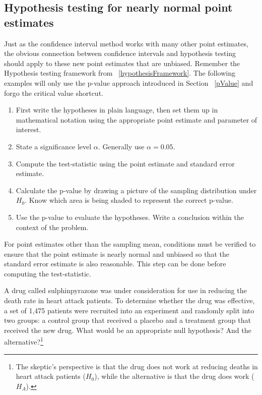\subsection{Hypothesis testing for nearly normal point estimates}

Just as the confidence interval method works with many other point estimates, the obvious connection between confidence intervals and hypothesis testing should apply to these new point estimates that are unbiased. Remember the Hypothesis testing framework from ~\ref{hypothesisFramework}. The following examples will only use the p-value approach introduced in Section ~\ref{pValue} and forgo the critical value shortcut.  

\begin{termBox}{
\begin{enumerate}
\setlength{\itemsep}{0mm}
\item First write the hypotheses in plain language, then set them up in mathematical notation using the appropriate point estimate and parameter of interest. 
\item State a significance level $\alpha$. Generally use $\alpha=0.05$. 
\item Compute the test-statistic using the point estimate and standard error estimate. 
\item Calculate the p-value by drawing a picture of the sampling distribution under $H_0$. Know which area is being shaded to represent the correct p-value. 
\item Use the p-value to evaluate the hypotheses. Write a conclusion within the context of the problem. 
\end{enumerate}
} For point estimates other than the sampling mean, conditions must be verified to ensure that the point estimate is nearly normal and unbiased so that the standard error estimate is also reasonable. This step can be done before computing the test-statistic.  
\end{termBox}

\begin{exercise} \label{fdaHypSetupForSulph}
A drug called sulphinpyrazone was under consideration for use in reducing the death rate in heart attack patients. To determine whether the drug was effective, a set of 1,475 patients were recruited into an experiment and randomly split into two groups: a control group that received a placebo and a treatment group that received the new drug. What would be an appropriate null hypothesis? And the alternative?\footnote{The skeptic's perspective is that the drug does not work at reducing deaths in heart attack patients ($H_0$), while the alternative is that the drug does work ($H_A$).}
\end{exercise}

